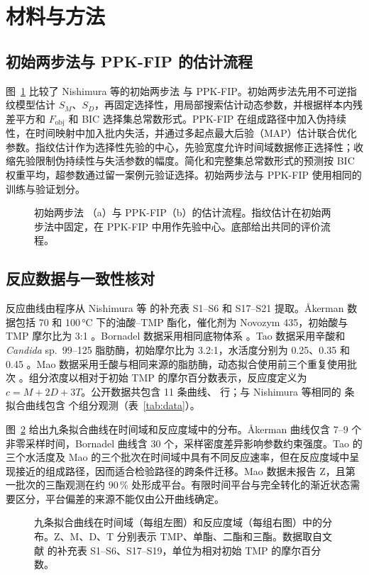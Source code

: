\section{材料与方法}\label{sec:methods}
\subsection{初始两步法与 PPK-FIP 的估计流程}
图~\ref{fig:workflow} 比较了 Nishimura 等的初始两步法 \cite{nishimura2026} 与 PPK-FIP。初始两步法先用不可逆指纹模型估计 $S_M$、$S_D$，再固定选择性，用局部搜索估计动态参数，并根据样本内残差平方和 $F_\mathrm{obj}$ 和 BIC 选择集总常数形式。PPK-FIP 在组成路径中加入伪持续性，在时间映射中加入批内失活，并通过多起点最大后验（MAP）估计联合优化参数。指纹估计作为选择性先验的中心，先验宽度允许时间域数据修正选择性；收缩先验限制伪持续性与失活参数的幅度。简化和完整集总常数形式的预测按 BIC 权重平均，超参数通过留一案例元验证选择。初始两步法与 PPK-FIP 使用相同的训练与验证划分。
\begin{figure}[!htbp]\centering{}\caption{初始两步法 \cite{nishimura2026}（a）与 PPK-FIP（b）的估计流程。指纹估计在初始两步法中固定，在 PPK-FIP 中用作先验中心。底部给出共同的评价流程。}\label{fig:workflow}\end{figure}

\subsection{反应数据与一致性核对}
反应曲线由程序从 Nishimura 等 \cite{nishimura2026} 的补充表 S1--S6 和 S17--S21 提取。Åkerman 数据包括 70 和 100\,°C 下的油酸--TMP 酯化，催化剂为 Novozym 435，初始酸与 TMP 摩尔比为 3:1 \cite{akerman2011}。Bornadel 数据采用相同底物体系 \cite{bornadel2013}。Tao 数据采用辛酸和 \emph{Candida} sp.\ 99--125 脂肪酶，初始摩尔比为 3.2:1，水活度分别为 0.25、0.35 和 0.45 \cite{tao2015}。Mao 数据采用壬酸与相同来源的脂肪酶，动态拟合使用前三个重复使用批次 \cite{mao2024}。组分浓度以相对于初始 TMP 的摩尔百分数表示，反应度定义为 $c=M+2D+3T$。公开数据共包含 11 条曲线、\NRows{} 行；与 Nishimura 等相同的 \NFitProfiles{} 条拟合曲线包含 \NFitPoints{} 个组分观测（表~\ref{tab:data}）。

图~\ref{fig:data} 给出九条拟合曲线在时间域和反应度域中的分布。Åkerman 曲线仅含 7--9 个非零采样时间，Bornadel 曲线含 30 个，采样密度差异影响参数约束强度。Tao 的三个水活度及 Mao 的三个批次在时间域中具有不同反应速率，但在反应度域中呈现接近的组成路径，因而适合检验路径的跨条件迁移。Mao 数据未报告 Z，且第一批次的三酯观测在约 90\,\% 处形成平台。有限时间平台与完全转化的渐近状态需要区分，平台偏差的来源不能仅由公开曲线确定。
\begin{figure}[!htbp]\centering{}\caption{九条拟合曲线在时间域（每组左图）和反应度域（每组右图）中的分布。Z、M、D、T 分别表示 TMP、单酯、二酯和三酯。数据取自文献 \cite{nishimura2026} 的补充表 S1--S6、S17--S19，单位为相对初始 TMP 的摩尔百分数。}\label{fig:data}\end{figure}

